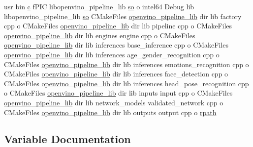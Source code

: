 \begin{DoxyCompactItemize}
usr bin \hyperlink{CMakeCache_8txt_aac1d6a1710812201527c735f7c6afbaa}{c} f\+P\+IC libopenvino\+\_\+pipeline\+\_\+lib \hyperlink{CMakeCache_8txt_aa98797039f48d335ee715de4cd92852f}{so} o intel64 Debug lib libopenvino\+\_\+pipeline\+\_\+lib \hyperlink{CMakeCache_8txt_aa98797039f48d335ee715de4cd92852f}{so} C\+Make\+Files \hyperlink{CMakeCache_8txt_a1825c89fbdf0553625ee2c5a9edcdf7f}{openvino\+\_\+pipeline\+\_\+lib} dir lib factory cpp o C\+Make\+Files \hyperlink{CMakeCache_8txt_a1825c89fbdf0553625ee2c5a9edcdf7f}{openvino\+\_\+pipeline\+\_\+lib} dir lib pipeline cpp o C\+Make\+Files \hyperlink{CMakeCache_8txt_a1825c89fbdf0553625ee2c5a9edcdf7f}{openvino\+\_\+pipeline\+\_\+lib} dir lib engines engine cpp o C\+Make\+Files \hyperlink{CMakeCache_8txt_a1825c89fbdf0553625ee2c5a9edcdf7f}{openvino\+\_\+pipeline\+\_\+lib} dir lib inferences base\+\_\+inference cpp o C\+Make\+Files \hyperlink{CMakeCache_8txt_a1825c89fbdf0553625ee2c5a9edcdf7f}{openvino\+\_\+pipeline\+\_\+lib} dir lib inferences age\+\_\+gender\+\_\+recognition cpp o C\+Make\+Files \hyperlink{CMakeCache_8txt_a1825c89fbdf0553625ee2c5a9edcdf7f}{openvino\+\_\+pipeline\+\_\+lib} dir lib inferences emotions\+\_\+recognition cpp o C\+Make\+Files \hyperlink{CMakeCache_8txt_a1825c89fbdf0553625ee2c5a9edcdf7f}{openvino\+\_\+pipeline\+\_\+lib} dir lib inferences face\+\_\+detection cpp o C\+Make\+Files \hyperlink{CMakeCache_8txt_a1825c89fbdf0553625ee2c5a9edcdf7f}{openvino\+\_\+pipeline\+\_\+lib} dir lib inferences head\+\_\+pose\+\_\+recognition cpp o C\+Make\+Files \hyperlink{CMakeCache_8txt_a1825c89fbdf0553625ee2c5a9edcdf7f}{openvino\+\_\+pipeline\+\_\+lib} dir lib inputs input cpp o C\+Make\+Files \hyperlink{CMakeCache_8txt_a1825c89fbdf0553625ee2c5a9edcdf7f}{openvino\+\_\+pipeline\+\_\+lib} dir lib network\+\_\+models validated\+\_\+network cpp o C\+Make\+Files \hyperlink{CMakeCache_8txt_a1825c89fbdf0553625ee2c5a9edcdf7f}{openvino\+\_\+pipeline\+\_\+lib} dir lib outputs output cpp o \hyperlink{CMakeFiles_2openvino__pipeline__lib_8dir_2link_8txt_ab0a26402d9649150dd228d3d929b783f}{rpath}
\end{DoxyCompactItemize}


\subsection{Variable Documentation}
